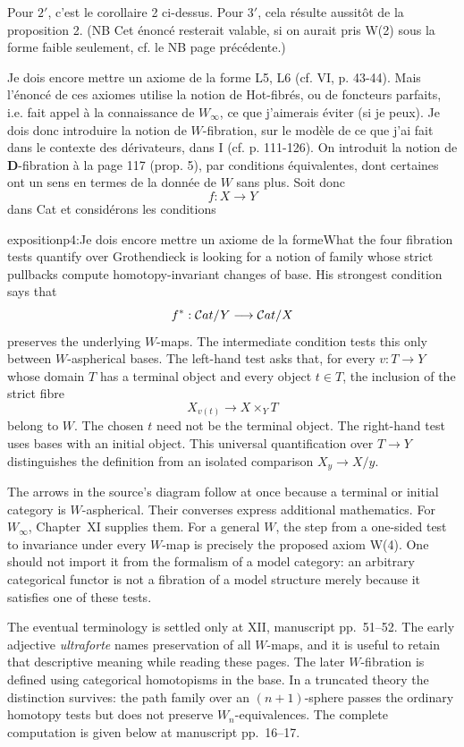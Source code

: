 Pour $2'$, c'est le corollaire 2 ci-dessus. Pour $3'$, cela résulte aussitôt de la proposition 2. (NB Cet énoncé resterait valable, si on aurait pris W(2) sous la forme faible seulement, cf. le NB page précédente.)

Je dois encore mettre un axiome de la forme L5, L6 (cf. VI, p. 43-44). Mais l'énoncé de ces axiomes utilise la notion de Hot-fibrés, ou de foncteurs parfaits, i.e. fait appel à la connaissance de $W_\infty$, ce que j'aimerais éviter (si je peux). Je dois donc introduire la notion de $W$-fibration, sur le modèle de ce que j'ai fait dans le contexte des dérivateurs, dans I (cf. p. 111-126). On introduit la notion de \textbf{D}-fibration à la page 117 (prop. 5), par conditions équivalentes, dont certaines ont un sens en termes de la donnée de $W$ sans plus. Soit donc
\[ f : X \longrightarrow Y \]
dans Cat et considérons les conditions

\begin{dcomment}{exposition}{p4:Je dois encore mettre un axiome de la forme}{What the four fibration tests quantify over}
Grothendieck is looking for a notion of family whose strict pullbacks compute homotopy-invariant changes of base. His strongest condition says that
\[
  f^*:\mathcal{C}at/Y\longrightarrow\mathcal{C}at/X
\]
preserves the underlying \(W\)-maps. The intermediate condition tests this only between \(W\)-aspherical bases. The left-hand test asks that, for every \(v:T\to Y\) whose domain \(T\) has a terminal object and every object \(t\in T\), the inclusion of the strict fibre
\[
   X_{v(t)}\longrightarrow X\times_Y T
\]
belong to \(W\). The chosen \(t\) need not be the terminal object. The right-hand test uses bases with an initial object. This universal quantification over \(T\to Y\) distinguishes the definition from an isolated comparison \(X_y\to X/y\).

The arrows in the source's diagram follow at once because a terminal or initial category is \(W\)-aspherical. Their converses express additional mathematics. For \(W_\infty\), Chapter~XI supplies them. For a general \(W\), the step from a one-sided test to invariance under every \(W\)-map is precisely the proposed axiom W(4). One should not import it from the formalism of a model category: an arbitrary categorical functor is not a fibration of a model structure merely because it satisfies one of these tests.

The eventual terminology is settled only at XII, manuscript pp.~51--52. The early adjective \emph{ultraforte} names preservation of all \(W\)-maps, and it is useful to retain that descriptive meaning while reading these pages. The later \(W\)-fibration is defined using categorical homotopisms in the base. In a truncated theory the distinction survives: the path family over an \((n+1)\)-sphere passes the ordinary homotopy tests but does not preserve \(W_n\)-equivalences. The complete computation is given below at manuscript pp.~16--17.
\end{dcomment}


